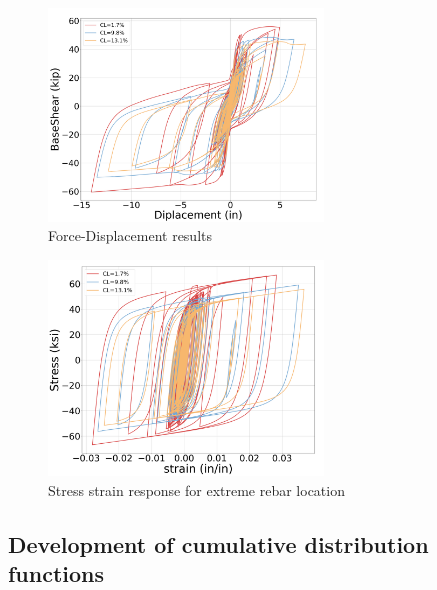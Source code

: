 \begin{figure}[htbp]
	\centering
	\includegraphics[width=0.65\textwidth]{Chapter-4/figs/ForceDisplacement_01}
	\caption{Force-Displacement results}
	\label{fig:Force-Displacement_Results}
\end{figure}
\begin{figure}[htbp]
	\centering
	\includegraphics[width=0.65\textwidth]{Chapter-4/figs/Steel_StressStrain}
	\caption{Stress strain response for extreme rebar location}
	\label{fig:Steel_Stress_Strain_Response}
\end{figure}

\subsection{Development of cumulative distribution functions}

